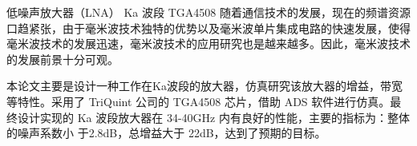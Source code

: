 
\begin{Cabstract}{低噪声放大器（LNA） }{Ka 波段 }{TGA4508}{}{}
随着通信技术的发展，现在的频谱资源口趋紧张，由于毫米波技术独特的优势以及毫米波单片集成电路的快速发展，使得毫米波技术的发展迅速，毫米波技术的应用研究也是越来越多。因此，毫米波技术的发展前景十分可观。

本论文主要是设计一种工作在Ka波段的放大器，仿真研究该放大器的增益，带宽等特性。采用了 TriQuint 公司的 TGA4508 芯片，借助 ADS 软件进行仿真。最终设计实现的 Ka 波段放大器在 34-40GHz 内有良好的性能，主要的指标为：整体的噪声系数小 于2.8dB，总增益大于 22dB，达到了预期的目标。
\end{Cabstract}

